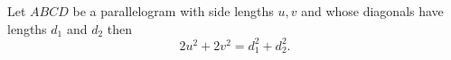 \documentclass{article}
\begin{document}
Let $ABCD$ be a parallelogram with side lengths $u,v$ and whose diagonals have lengths $d_1$ and $d_2$ then
$$2u^2+2v^2=d_1^2 + d_2^2.$$


\begin{center}
\end{center}
\end{document}

